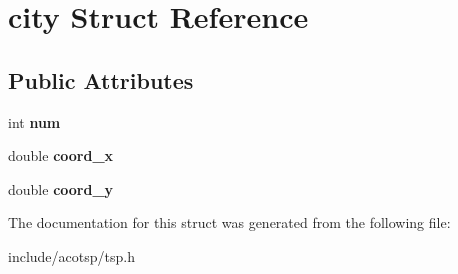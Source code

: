 \hypertarget{structcity}{\section{city Struct Reference}
\label{structcity}
}
\subsection*{Public Attributes}
\begin{DoxyCompactItemize}
\item 
\hypertarget{structcity_a79f586d156d229e90214f7ed8332b176}{int {\bfseries num}}\label{structcity_a79f586d156d229e90214f7ed8332b176}

\item 
\hypertarget{structcity_acbb391567cfca7d7b5d8632d7d302e23}{double {\bfseries coord\-\_\-x}}\label{structcity_acbb391567cfca7d7b5d8632d7d302e23}

\item 
\hypertarget{structcity_a4d3662cdd2913eebb63479fa4c0da51c}{double {\bfseries coord\-\_\-y}}\label{structcity_a4d3662cdd2913eebb63479fa4c0da51c}

\end{DoxyCompactItemize}


The documentation for this struct was generated from the following file\-:\begin{DoxyCompactItemize}
\item 
include/acotsp/tsp.\-h\end{DoxyCompactItemize}

